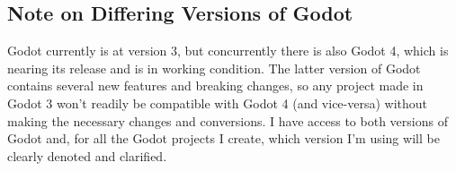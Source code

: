 \subsection{Note on Differing Versions of Godot}

Godot currently is at version 3, but concurrently there is also Godot 4, which is nearing its release and is in working condition. The latter version of Godot contains several new features and breaking changes, so any project made in Godot 3 won't readily be compatible with Godot 4 (and vice-versa) without making the necessary changes and conversions. I have access to both versions of Godot and, for all the Godot projects I create, which version I'm using will be clearly denoted and clarified.